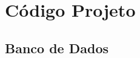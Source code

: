\documentclass[oneside]{article}
\begin{document}

\newpage

\newpage
\tableofcontents
\newpage



\section{Código Projeto}



\subsection{Banco de Dados}


\end{document}
